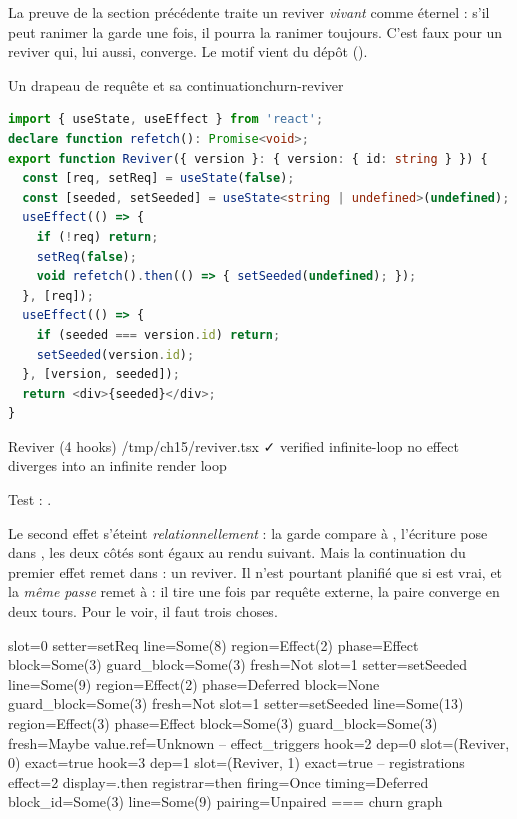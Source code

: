 La preuve de la section précédente traite un reviver \emph{vivant} comme éternel : s'il peut
ranimer la garde une fois, il pourra la ranimer toujours. C'est faux pour un reviver qui,
lui aussi, converge. Le motif vient du dépôt  ().

\begin{exemple}{Un drapeau de requête et sa continuation}{churn-reviver}
\begin{lstlisting}[language=TypeScript,caption={\file{/tmp/ch15/reviver.tsx}},label={lst:churn-reviver}]
import { useState, useEffect } from 'react';
declare function refetch(): Promise<void>;
export function Reviver({ version }: { version: { id: string } }) {
  const [req, setReq] = useState(false);
  const [seeded, setSeeded] = useState<string | undefined>(undefined);
  useEffect(() => {
    if (!req) return;
    setReq(false);
    void refetch().then(() => { setSeeded(undefined); });
  }, [req]);
  useEffect(() => {
    if (seeded === version.id) return;
    setSeeded(version.id);
  }, [version, seeded]);
  return <div>{seeded}</div>;
}
\end{lstlisting}
\begin{sortie}
  Reviver  (4 hooks)  /tmp/ch15/reviver.tsx  ✓
    verified  infinite-loop  no effect diverges into an infinite render loop
\end{sortie}
Test : \allowbreak{}.
\end{exemple}

Le second effet s'éteint \emph{relationnellement} : la garde compare  à
, l'écriture pose  dans , les deux côtés sont
égaux au rendu suivant. Mais la continuation  du premier effet remet
 dans  : un reviver. Il n'est pourtant planifié que si
 est vrai, et la \emph{même passe} remet  à  : il tire une
fois par requête externe, la paire converge en deux tours. Pour le voir, il faut trois
choses.

\begin{sortie}
  slot=0 setter=setReq    line=Some(8)  region=Effect(2) phase=Effect   block=Some(3) guard_block=Some(3) fresh=Not
  slot=1 setter=setSeeded line=Some(9)  region=Effect(2) phase=Deferred block=None    guard_block=Some(3) fresh=Not
  slot=1 setter=setSeeded line=Some(13) region=Effect(3) phase=Effect   block=Some(3) guard_block=Some(3) fresh=Maybe value.ref=Unknown
-- effect_triggers
  hook=2 dep=0 slot=(Reviver, 0) exact=true
  hook=3 dep=1 slot=(Reviver, 1) exact=true
-- registrations
  effect=2 display=.then registrar=then firing=Once timing=Deferred block_id=Some(3) line=Some(9) pairing=Unpaired
=== churn graph
\end{sortie}

